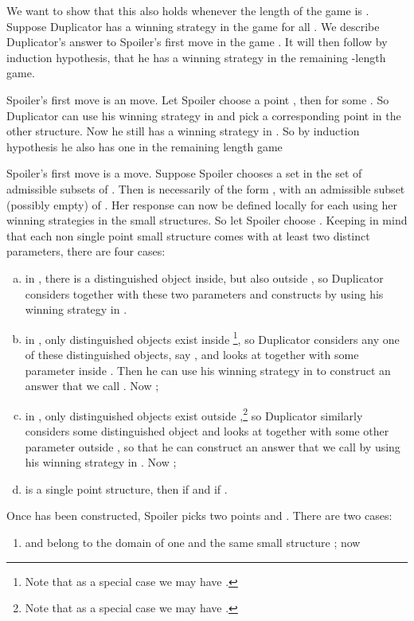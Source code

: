 \documentclass{LMCS}
\begin{document}
We want to show that this also holds whenever the length of the game
is . Suppose Duplicator has a winning strategy in the game
 for all . We describe Duplicator's answer to Spoiler's first
move in the game . It will then follow by
induction hypothesis, that he has a winning strategy in the
remaining -length game.
\begin{iteMize}{}
\item   Spoiler's first move is an  move. Let Spoiler choose a point , then  for some . So Duplicator can use his
winning strategy in
 and pick a
corresponding point  in the other structure. Now he still has a
winning strategy in
. So by
induction hypothesis he also has one in the remaining  length
game 
\item   Spoiler's first move is a  move. Suppose Spoiler chooses a set
 in the set of admissible subsets of . Then  is necessarily of the form , with  an admissible subset (possibly empty)
of . Her response  can now be
defined locally for each  using her winning strategies in the
small structures. So let Spoiler choose .
Keeping in mind that each non single point small structure comes with
at least two distinct parameters, there are four cases:
\begin{enumerate}[a)]
\item     in , there is a distinguished object inside, but also
outside , so Duplicator considers  together with these
two parameters and constructs  by using his winning strategy
in .
\item   in , only distinguished objects exist
inside \footnote{Note that as a special case we may have
.}, so Duplicator considers any one of these
distinguished objects, say , and looks at  together with some parameter inside .  Then he can
use his winning strategy in
 to construct
an answer that we call . Now ;
\item in , only distinguished objects exist outside
  ,\footnote{Note that as a special case we may have
  .} so Duplicator similarly considers some
  distinguished object  and looks at  together
  with some other parameter outside , so that he can construct an
  answer that we call  by using his winning strategy in
  . Now
  ;
\item     is a single point structure, then
 if  and  if
.
\end{enumerate}
Once  has been constructed, Spoiler
picks two points  and . There are two cases:
\begin{enumerate}[1.]
\item   and  belong to the domain of one and the same small structure  ; now 

\end{enumerate}
\end{iteMize}
\end{document}
